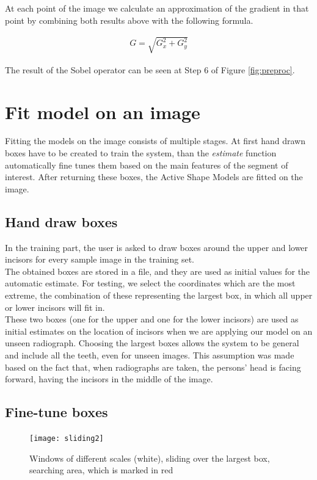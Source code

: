 \documentclass[a4paper]{article}
\begin{document}
At each point of the image we calculate an approximation of the gradient in that point by combining both results above with the following formula.

\begin{align}
   G = \sqrt{ G_x^2 + G_y^2 }
\end{align}

The result of the Sobel operator can be seen at Step 6 of Figure \ref{fig:preproc}. 

\section{Fit model on an image}\label{sec:fitting}
Fitting the models on the image consists of multiple stages. At first hand drawn boxes have to be created to train the system, than the \textit{estimate} function automatically fine tunes them based on the main features of the segment of interest. After returning these boxes, the Active Shape Models are fitted on the image.

\subsection{Hand draw boxes}
In the training part, the user is asked to draw boxes around the upper and lower incisors for every sample image in the training set.\\ 
The obtained boxes are stored in a file, and they are used as initial values for the automatic estimate. For testing, we select the coordinates which are the most extreme, the combination of these representing the largest box, in which all upper or lower incisors will fit in. \\ 
These two boxes (one for the upper and one for the lower incisors) are used as initial estimates on the location of incisors when we are applying our model on an unseen radiograph. Choosing the largest boxes allows the system to be general and include all the teeth, even for unseen images. This assumption was made based on the fact that, when radiographs are taken, the persons' head is facing forward, having the incisors in the middle of the image.  

\subsection{Fine-tune boxes}

\begin{figure}[htp] 
    \centering
    \texttt{[image: sliding2]}
    \caption{Windows of different scales (white), sliding over the largest box, searching area, which is marked in red }
    \label{fig:sliding}
\end{figure}
\end{document}
